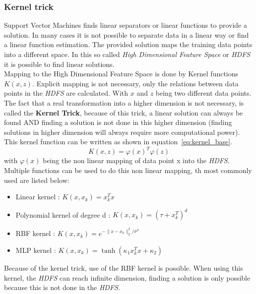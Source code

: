 \subsubsection{Kernel trick}\label{subsec:kerneltrick}
Support Vector Machines finds linear separators or linear functions to provide a solution.
In many cases it is not possible to separate data in a linear way or find a linear function estimation.
The provided solution maps the training data points into a different space.
In this so called \textit{High Dimensional Feature Space} or \textit{HDFS} it is possible to find linear solutions. \\
Mapping to the High Dimensional Feature Space is done by Kernel functions $K(x,z)$. 
Explicit mapping is not necessary, only the relations between data points in the \textit{HDFS} are calculated.
With $x$ and $z$ being two different data points.
The fact that a real transformation into a higher dimension is not necessary, is called the \textbf{Kernel Trick}, 
because of this trick, a linear solution can always be found AND finding a solution is not done in this higher dimension (finding solutions in higher dimension will always require more computational power).
This kernel function can be written as shown in equation~\ref{eq:kernel_base}.
\begin{equation}
	K(x,z) = \varphi(x)^T\varphi(z)
	\label{eq:kernel_base}
\end{equation}
with $\varphi(x)$ being the non linear mapping of data point x into the \textit{HDFS}.\\
Multiple functions can be used to do this non linear mapping, th most commonly used are listed below:
\begin{itemize}
	\item Linear kernel : $K(x,x_k) = x_k^Tx$
	\item Polynomial kernel of degree d : $K(x,x_k) = (\tau + x_k^T)^d$
	\item RBF kernel : $K(x,x_k) = e^{-\parallel x - x_k \parallel_2^2 / \sigma^2}$
	\item MLP kernel : $K(x,x_k) = \tanh(\kappa_1 x_k^T x + \kappa_2)$
\end{itemize}
Because of the kernel trick, use of the RBF kernel is possible. 
When using this kernel, the \textit{HDFS} can reach infinite dimension, finding a solution is only possible because this is not done in the \textit{HDFS}. 

